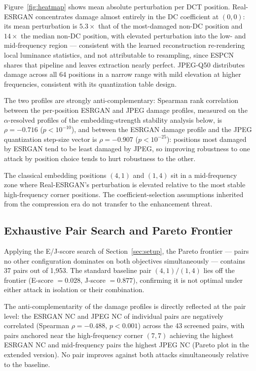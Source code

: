 \documentclass[conference]{IEEEtran}
\begin{document}
Figure~\ref{fig:heatmap} shows mean absolute perturbation per DCT
position. Real-ESRGAN concentrates damage almost entirely in the DC
coefficient at $(0,0)$: its mean perturbation is $5.3\times$ that of the
most-damaged non-DC position and $14\times$ the median non-DC position,
with elevated perturbation into the low- and mid-frequency region ---
consistent with the learned reconstruction re-rendering local luminance
statistics, and not attributable to resampling, since ESPCN shares that
pipeline and leaves extraction nearly perfect. JPEG-Q50 distributes damage across all
64 positions in a narrow range with mild elevation at higher frequencies,
consistent with its quantization table design.

The two profiles are strongly anti-complementary: Spearman rank
correlation between the per-position ESRGAN and JPEG damage profiles,
measured on the $\alpha$-resolved profiles of the embedding-strength
stability analysis below, is
$\rho = -0.716$ ($p < 10^{-10}$), and between the ESRGAN damage profile
and the JPEG quantization step-size vector is $\rho = -0.907$
($p < 10^{-25}$): positions most damaged by ESRGAN tend to be least
damaged by JPEG, so improving robustness to one attack by position
choice tends to hurt robustness to the other.

The classical embedding positions $(4,1)$ and $(1,4)$ sit in a
mid-frequency zone where Real-ESRGAN's perturbation is elevated relative
to the most stable high-frequency corner positions. The
coefficient-selection assumptions inherited from the compression era do
not transfer to the enhancement threat.

\subsection{Exhaustive Pair Search and Pareto Frontier}

Applying the E/J-score search of Section~\ref{sec:setup}, the Pareto
frontier --- pairs no other configuration dominates on both objectives
simultaneously --- contains 37 pairs out of 1,953. The standard baseline
pair $(4,1)/(1,4)$ lies off the frontier (E-score $= 0.028$, J-score
$= 0.877$), confirming it is not optimal under either attack in
isolation or their combination.

The anti-complementarity of the damage profiles is directly reflected at
the pair level: the ESRGAN NC and JPEG NC of individual pairs are
negatively correlated (Spearman $\rho = -0.488$, $p < 0.001$) across the
43 screened pairs, with pairs anchored near the high-frequency corner
$(7,7)$ achieving the highest ESRGAN NC and mid-frequency pairs the
highest JPEG NC (Pareto plot in the extended version). No pair improves
against both attacks simultaneously relative to the baseline.
\end{document}

